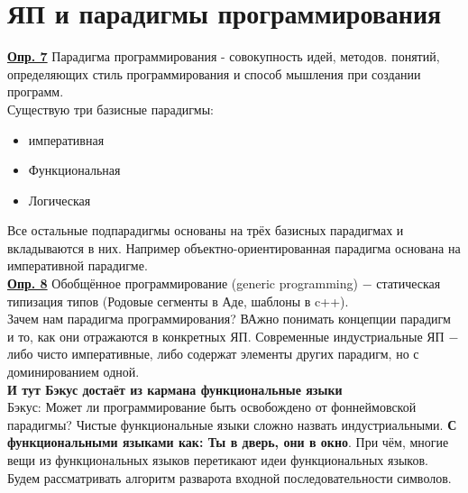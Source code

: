 \documentclass[a4paper, 12pt, titlepage, finall]{extreport}
\begin{document}
    \chapter{ЯП и парадигмы программирования}
        \underline{\bf Опр. 7} Парадигма программирования - совокупность идей, методов. понятий, определяющих стиль программирования и способ мышления при создании программ.\\
        Существую три базисные парадигмы:
        \begin{itemize}
            \item императивная
            \item Функциональная
            \item Логическая
        \end{itemize}
        Все остальные подпарадигмы основаны на трёх базисных парадигмах и вкладываются в них. Например объектно-ориентированная парадигма основана на императивной парадигме.\\
        \underline{\bf Опр. 8} Обобщённое программирование (generic programming) $-$ статическая типизация типов (Родовые сегменты в Аде, шаблоны в c++).\\
        Зачем нам парадигма программирования? ВАжно понимать концепции парадигм и то, как они отражаются в конкретных ЯП.
        Современные индустриальные ЯП $-$ либо чисто императивные, либо содержат элементы других парадигм, но с доминированием одной.\\
        {\bf И тут Бэкус достаёт из кармана функциональные языки}\\
        Бэкус: Может ли программирование быть освобождено от фоннеймовской парадигмы?
        Чистые функциональные языки сложно назвать индустриальными. {\bf С функциональными языками как: Ты в дверь, они в окно}.
        При чём, многие вещи из функциональных языков перетикают идеи функциональных языков.
        Будем рассматривать алгоритм разварота входной последовательности символов.
\end{document}
